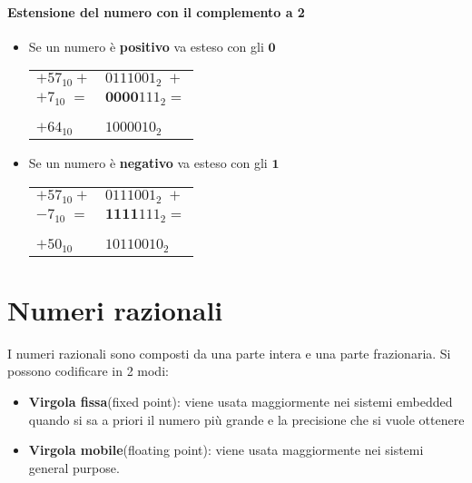\documentclass[a4paper]{article}
\theoremstyle{break}
\theoremstyle{break}
\theoremstyle{break}
\theoremstyle{break}
\begin{document}
\paragraph{Estensione del numero con il complemento a 2}
\begin{itemize}
	\item Se un numero è \textbf{positivo} va esteso con gli \( \textbf{0} \)
	      \begin{center}
		      \begin{tabular}{l|l}                                        \\
			      \( +57_{10}+ \)  & \( 0111001_2\;+ \)        \\
			      \( +7_{10}\;= \) & \( \textbf{0000}111_2= \) \\ \\
			      \hline                                       \\
			      \( +64_{10} \)   & \( 1000010_2 \)
		      \end{tabular}
	      \end{center}
	\item Se un numero è \textbf{negativo} va esteso con gli \( \textbf{1} \)
	      \begin{center}
		      \begin{tabular}{l|l}                                        \\
			      \( +57_{10}+ \)  & \( 0111001_2\;+ \)        \\
			      \( -7_{10}\;= \) & \( \textbf{1111}111_2= \) \\ \\
			      \hline                                       \\
			      \( +50_{10} \)   & \( 10110010_2 \)
		      \end{tabular}
	      \end{center}
\end{itemize}

\section{Numeri razionali}
I numeri razionali sono composti da una parte intera e una parte frazionaria.
Si possono codificare in 2 modi:
\begin{itemize}
	\item \textbf{Virgola fissa}(fixed point): viene usata maggiormente nei
	      sistemi embedded quando si sa a priori il numero più grande e la
	      precisione che si vuole ottenere
	\item \textbf{Virgola mobile}(floating point): viene usata maggiormente
	      nei sistemi general purpose.
\end{itemize}
\end{document}
